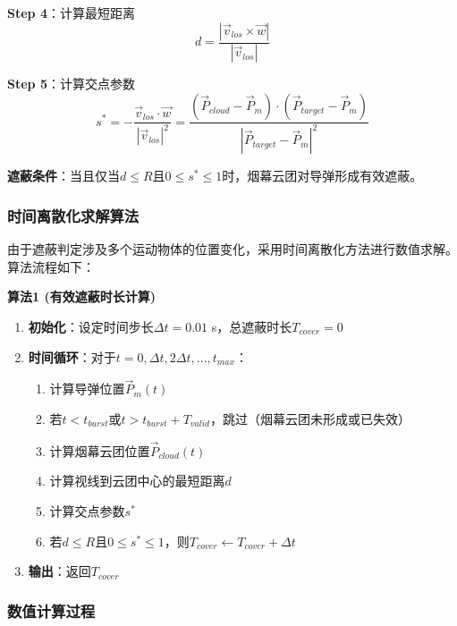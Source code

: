 \documentclass[12pt,a4paper]{article}
\begin{document}
\indent \textbf{Step 4}：计算最短距离
\begin{equation}
d = \frac{|\vec{v}_{los} \times \vec{w}|}{|\vec{v}_{los}|}
\end{equation}

\indent \textbf{Step 5}：计算交点参数
\begin{equation}
s^* = -\frac{\vec{v}_{los} \cdot \vec{w}}{|\vec{v}_{los}|^2} = \frac{(\vec{P}_{cloud} - \vec{P}_m) \cdot (\vec{P}_{target} - \vec{P}_m)}{|\vec{P}_{target} - \vec{P}_m|^2}
\end{equation}

\indent \textbf{遮蔽条件}：当且仅当$d \leq R$且$0 \leq s^* \leq 1$时，烟幕云团对导弹形成有效遮蔽。

\subsubsection{时间离散化求解算法}

\indent 由于遮蔽判定涉及多个运动物体的位置变化，采用时间离散化方法进行数值求解。算法流程如下：

\noindent\textbf{算法1 (有效遮蔽时长计算)}

\begin{enumerate}
\item \textbf{初始化}：设定时间步长$\Delta t = 0.01$ s，总遮蔽时长$T_{cover} = 0$

\item \textbf{时间循环}：对于$t = 0, \Delta t, 2\Delta t, \ldots, t_{max}$：
\begin{enumerate}
\item[(a)] 计算导弹位置$\vec{P}_m(t)$
\item[(b)] 若$t < t_{burst}$或$t > t_{burst} + T_{valid}$，跳过（烟幕云团未形成或已失效）
\item[(c)] 计算烟幕云团位置$\vec{P}_{cloud}(t)$
\item[(d)] 计算视线到云团中心的最短距离$d$
\item[(e)] 计算交点参数$s^*$
\item[(f)] 若$d \leq R$且$0 \leq s^* \leq 1$，则$T_{cover} \leftarrow T_{cover} + \Delta t$
\end{enumerate}

\item \textbf{输出}：返回$T_{cover}$
\end{enumerate}

\subsubsection{数值计算过程}
\end{document}

